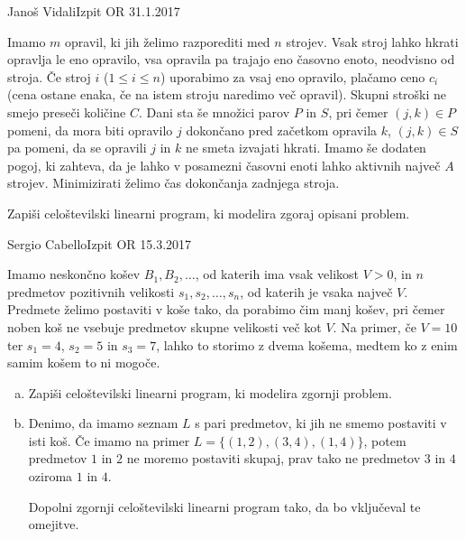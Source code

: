 \begin{naloga}{Janoš Vidali}{Izpit OR 31.1.2017}
\begin{vprasanje}[opravila]
Imamo $m$ opravil, ki jih želimo razporediti med $n$ strojev.
Vsak stroj lahko hkrati opravlja le eno opravilo,
vsa opravila pa trajajo eno časovno enoto, neodvisno od stroja.
Če stroj $i$ ($1 \le i \le n$) uporabimo za vsaj eno opravilo,
plačamo ceno $c_i$
(cena ostane enaka, če na istem stroju naredimo več opravil).
Skupni stroški ne smejo preseči količine $C$.
Dani sta še množici parov $P$ in $S$,
pri čemer $(j, k) \in P$ pomeni,
da mora biti opravilo $j$ dokončano pred začetkom opravila $k$,
$(j, k) \in S$ pa pomeni, da se opravili $j$ in $k$ ne smeta izvajati hkrati.
Imamo še dodaten pogoj, ki zahteva,
da je lahko v posamezni časovni enoti lahko aktivnih največ $A$ strojev.
Minimizirati želimo čas dokončanja zadnjega stroja.

Zapiši celoštevilski linearni program, ki modelira zgoraj opisani problem.
\end{vprasanje}
\begin{odgovor}
\end{odgovor}
\end{naloga}


\begin{naloga}{Sergio Cabello}{Izpit OR 15.3.2017}
\begin{vprasanje}[polnjenje]
Imamo neskončno košev $B_1, B_2, \dots$,
od katerih ima vsak velikost $V > 0$,
in $n$ predmetov pozitivnih velikosti $s_1, s_2, \dots, s_n$,
od katerih je vsaka največ $V$.
Predmete želimo postaviti v koše tako, da porabimo čim manj košev,
pri čemer noben koš ne vsebuje predmetov skupne velikosti več kot $V$.
Na primer, če $V = 10$ ter $s_1 = 4$, $s_2 = 5$ in $s_3 = 7$,
lahko to storimo z dvema košema, medtem ko z enim samim košem to ni mogoče.

\begin{enumerate}[(a)]
\item Zapiši celoštevilski linearni program, ki modelira zgornji problem.

\item Denimo, da imamo seznam $L$ s pari predmetov,
ki jih ne smemo postaviti v isti koš.
Če imamo na primer $L = \{(1, 2), (3, 4), (1, 4)\}$,
potem predmetov $1$ in $2$ ne moremo postaviti skupaj,
prav tako ne predmetov $3$ in $4$ oziroma $1$ in $4$.

Dopolni zgornji celoštevilski linearni program tako,
da bo vključeval te ome\-jit\-ve.
\end{enumerate}
\end{vprasanje}
\begin{odgovor}
\end{odgovor}
\end{naloga}


